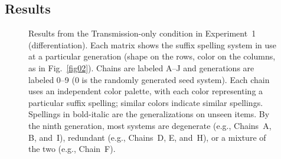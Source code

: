 \documentclass[doc,biblatex]{apa7}
\begin{document}
\subsection{Results}

	\begin{figure}
	\vspace*{2pt}
	\caption{Results from the Transmission-only condition in Experiment~1 (differentiation). Each matrix shows the suffix spelling system in use at a particular generation (shape on the rows, color on the columns, as in Fig.~\ref{fig02}). Chains are labeled A--J and generations are labeled 0--9 (0 is the randomly generated seed system). Each chain uses an independent color palette, with each color representing a particular suffix spelling; similar colors indicate similar spellings. Spellings in bold-italic are the generalizations on unseen items. By the ninth generation, most systems are degenerate (e.g., Chains~A, B, and~I), redundant (e.g., Chains~D, E, and~H), or a mixture of the two (e.g., Chain~F).}
	\label{fig04}
	\end{figure}
\end{document}

